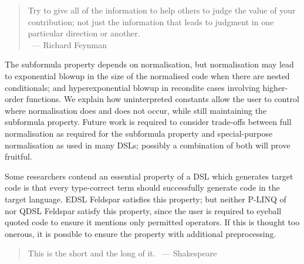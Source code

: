 \documentclass[authoryear,9pt]{sigplanconf}
\newcommand{\flushr}{{}\mbox{~}\hfill}%
\begin{document}
\vspace{2ex}
\begin{quote}
Try to give all of the information to help others to judge the value
of your contribution; not just the information that leads to judgment
in one particular direction or another. \\
\flushr --- Richard Feynman
\end{quote}

The subformula property depends on normalisation, but normalisation
may lead to exponential blowup in the size of the normalised
code when there are nested conditionals;
and hyperexponential blowup in recondite cases involving higher-order functions.
We explain how uninterpreted constants allow the user to
control where normalisation does and does not occur, while still
maintaining the subformula property. Future work is required to
consider trade-offs between full normalisation as required for
the subformula property and special-purpose normalisation as used
in many DSLs; possibly a combination of both will prove fruitful.

Some researchers contend an essential property of a DSL
which generates target code is that every type-correct term
should successfully generate code in the target language. EDSL Feldspar
satisfies this property; but neither
P-LINQ of \citet{cheney:linq} nor QDSL Feldspar
satisfy this property, since the user is required to eyeball quoted
code to ensure it mentions only permitted operators. If this is
thought too onerous, it is possible to ensure the property with
additional preprocessing.

\vspace{2ex}
\begin{quote}
This is the short and the long of it. \flushr --- Shakespeare
\end{quote}
\end{document}
